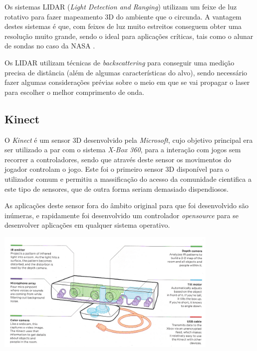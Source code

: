 Os sistemas LIDAR (\emph{Light Detection and Ranging}) utilizam um feixe de luz rotativo para fazer mapeamento 3D
do ambiente que o circunda. A vantagem destes sistemas é que, com feixes de
luz muito estreitos conseguem obter uma resolução muito grande, sendo o ideal
para aplicações críticas, tais como o alunar de sondas no caso da NASA \cite{Keim2010}.

Os LIDAR utilizam técnicas de \emph{backscattering} para conseguir uma medição
precisa de distância (além de algumas características do alvo), sendo necessário fazer algumas considerações prévias sobre o meio em que se vai propagar o laser para escolher o melhor comprimento de onda.


\subsection{Kinect}\label{kinect}

O \emph{Kinect} é um sensor 3D desenvolvido pela \emph{Microsoft}, cujo objetivo principal era ser utilizado a par com o sistema \emph{X-Box 360}, para a interação com jogos sem recorrer a controladores, sendo que através deste sensor os movimentos do jogador controlam o jogo. Este foi o primeiro sensor 3D disponível para o utilizador comum e permitiu a massificação do acesso da comunidade cientifica a este tipo de sensores, que de outra forma seriam demasiado dispendiosos.

As aplicações deste sensor fora do âmbito original para que foi desenvolvido são inúmeras, e rapidamente foi desenvolvido um controlador \emph{opensource} para se desenvolver aplicações em qualquer sistema operativo.

\begin{center}
	\includegraphics[width=0.80\textwidth]{./figures/Kinect.png}
	\label{fig:5}
\end{center}

